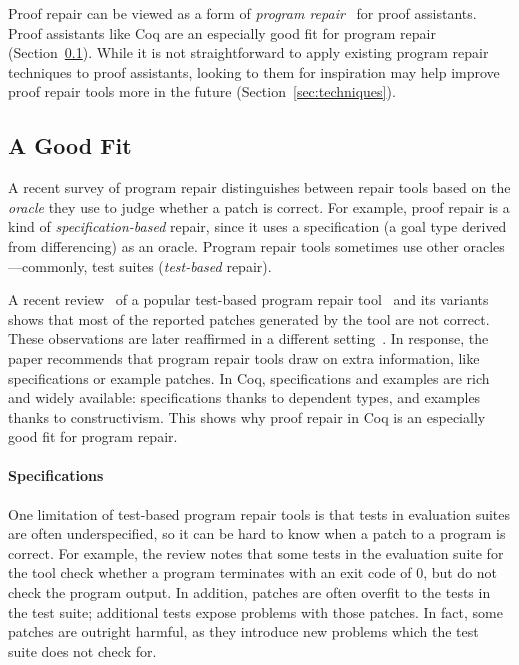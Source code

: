 Proof repair can be viewed as a form of \textit{program repair}~\cite{Monperrus:2018:ASR:3177787.3105906, Gazzola:2018:ASR:3180155.3182526}
for proof assistants. %
Proof assistants like Coq are an especially good fit for program repair (Section~\ref{sec:lessons}).
While it is not straightforward to apply existing program repair techniques to proof assistants,
looking to them for inspiration may help improve proof repair tools more in the future (Section~\ref{sec:techniques}).

\subsection{A Good Fit}
\label{sec:lessons}

A recent survey of program repair distinguishes between repair tools based on the \textit{oracle} they use to
judge whether a patch is correct.
For example, proof repair is a kind of \textit{specification-based} repair,
since it uses a specification (a goal type derived from differencing) as an oracle.
Program repair tools sometimes use other oracles---commonly, test suites (\textit{test-based} repair).

A recent review~\cite{Qi:2015:APP:2771783.2771791} of a popular test-based program repair tool~\cite{LeGoues:2012:SSA:2337223.2337225} and its variants
shows that most of the reported patches generated by the tool are not correct.
These observations are later reaffirmed in a different setting~\cite{DBLP:journals/corr/abs-1811-02429}.
In response, the paper recommends that program repair tools draw on extra information, like specifications or example patches.
In Coq, specifications and examples are rich and widely available: specifications thanks to dependent types,
and examples thanks to constructivism. This shows why proof repair in Coq is an especially good fit for program repair.
 
\paragraph{Specifications}
One limitation of test-based program repair tools is that tests in evaluation suites are often underspecified,
so it can be hard to know when a patch to a program is correct.
For example, the review notes that some tests in the evaluation suite for the tool check whether a program terminates with an exit code of 0, 
but do not check the program output.
In addition, patches are often overfit to the tests in the test suite; additional tests expose problems with those patches.
In fact, some patches are outright harmful, as they introduce new problems which the test suite does not check for.


